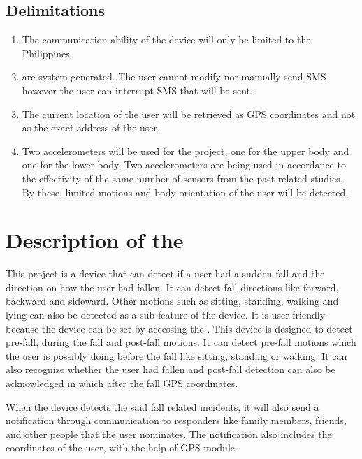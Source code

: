 \subsection{Delimitations}
\begin{enumerate}
	\item The communication ability of the device will only be limited to the Philippines.
	
	\item {} are system-generated. The user cannot modify nor manually send  SMS however the user can interrupt SMS that will be sent.  
	
	\item The current location of the user will be retrieved as GPS coordinates and not as the exact address of the user.
	
	\item Two accelerometers will be used for the project, one for the upper body and one for the lower body. Two accelerometers are being used in accordance to the effectivity of the same number of sensors from the past related studies. By these, limited motions and body orientation of the user will be detected.
	
\end{enumerate}

\section{Description of the \documentType}

This project is a device that can detect if a user had a sudden fall and the direction on how the user had fallen. It can detect fall directions like forward, backward and sideward. Other motions such as sitting, standing, walking and lying can also be detected as a sub-feature of the device. It is user-friendly because the device can be set by accessing the . This device is designed to detect pre-fall, during the fall and post-fall motions. It can detect pre-fall motions which the user is possibly doing before the fall like sitting, standing or walking. It can also recognize whether the user had fallen and post-fall detection can also be acknowledged in which after the fall GPS coordinates.

When the device detects the said fall related incidents, it will also send a notification through  communication to responders like family members, friends, and other people that the user nominates. The notification also includes the  coordinates of the user, with the help of GPS module. 

